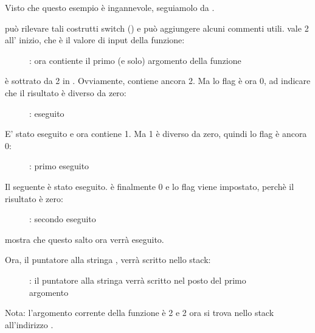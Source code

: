 ﻿\clearpage
\mysubparagraph{\olly}

Visto che questo esempio è ingannevole, seguiamolo da \olly.

\olly può rilevare tali costrutti switch () e può aggiungere alcuni commenti utili.
\EAX vale 2 all' inizio, che è il valore di input della funzione: 

\begin{figure}[H]
\centering
{}
\caption{\olly: \EAX 
ora contiente il primo (e solo) argomento della funzione}
\label{fig:switch_few_olly1}
\end{figure}

 è sottrato da 2 in \EAX. 
Ovviamente, \EAX contiene ancora 2.
Ma lo \ZF flag è ora 0, ad indicare che il risultato è diverso da zero:

\begin{figure}[H]
\centering
{}
\caption{\olly: \SUB eseguito}
\label{fig:switch_few_olly2}
\end{figure}

\clearpage
E' stato eseguito \DEC e ora \EAX contiene 1. 
Ma 1 è diverso da zero, quindi lo \ZF flag è ancora 0:

\begin{figure}[H]
\centering
{}
\caption{\olly: primo \DEC eseguito}
\label{fig:switch_few_olly3}
\end{figure}

\clearpage
Il seguente \DEC è stato eseguito. 
\EAX è finalmente 0 e lo \ZF flag viene impostato, perchè il risultato è zero:

\begin{figure}[H]
\centering
{}
\caption{\olly: secondo \DEC eseguito}
\label{fig:switch_few_olly4}
\end{figure}

\olly mostra che questo salto ora verrà eseguito.

\clearpage
Ora, il puntatore alla stringa , verrà scritto nello stack:

\begin{figure}[H]
\centering
{}
\caption{\olly: 
il puntatore alla stringa verrà scritto nel posto del primo argomento}
\label{fig:switch_few_olly5}
\end{figure}

Nota: l'argomento corrente della funzione è 2 e 2 ora si trova nello stack all'indirizzo .

